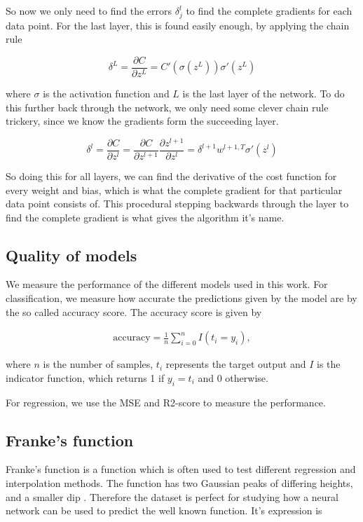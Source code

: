 \documentclass[../main.tex]{subfiles}
\begin{document}
So now we only need to find the errors $\delta_j^l$ to find the complete gradients for each data point. For the last layer, this is found easily enough, by applying the chain rule

\begin{equation*}
    \delta^L = \frac{\partial C}{\partial z^L} = C'\left(\sigma(z^L)\right) \sigma'(z^L)
\end{equation*}

where $\sigma$ is the activation function and $L$ is the last layer of the network. To do this further back through the network, we only need some clever chain rule trickery, since we know the gradients form the succeeding layer.

\begin{equation*}
    \delta^l = \frac{\partial C}{\partial z^l} = \frac{\partial C}{\partial z^{l+1}} \frac{\partial z^{l+1}}{\partial z^l} = \delta^{l+1} w^{l+1, T}\sigma'(z^l)
\end{equation*}

So doing this for all layers, we can find the derivative of the cost function for every weight and bias, which is what the complete gradient for that particular data point consists of. This procedural stepping backwards through the layer to find the complete gradient is what gives the algorithm it's name.


\subsection{Quality of models}
We measure the performance of the different models used in this work. For classification, we measure how accurate the predictions given by the model are by the so called accuracy score. The accuracy score is given by

\begin{align}
    \text{accuracy}=\frac{1}{n}\sum_{i=0}^nI(t_i=y_i),
    \label{eq:accuracy-score}
\end{align}

where $n$ is the number of samples, $t_i$ represents the target output and $I$ is the indicator function, which returns 1 if \ensuremath{y_i=t_i} and 0 otherwise. 

For regression, we use the MSE and R2-score to measure the performance. 

\subsection{Franke's function}
Franke’s function is a function which is often used to test different regression and interpolation methods. The function has two Gaussian peaks of differing heights, and a smaller dip \cite{FrankeRichard1979}. Therefore the dataset is perfect for studying how a neural network can be used to predict the well known function. It's expression is
\end{document}
